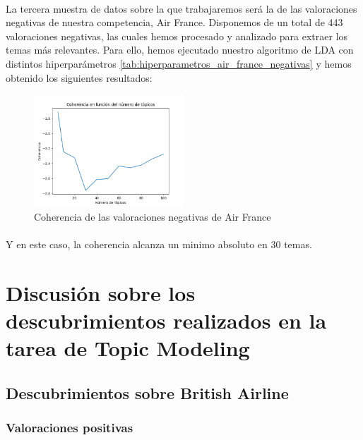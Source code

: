 \documentclass{report}
\begin{document}
                    \paragraph*{}{
                        La tercera muestra de datos sobre la que trabajaremos será la de las valoraciones negativas de nuestra competencia, Air France.
                        Disponemos de un total de 443 valoraciones negativas, las cuales hemos procesado y analizado para extraer los temas más relevantes.
                        Para ello, hemos ejecutado nuestro algoritmo de LDA con distintos hiperparámetros \ref{tab:hiperparametros_air_france_negativas} y hemos obtenido los siguientes resultados:
                    }
                    \begin{figure}[H]
                        \centering
                        \includegraphics[width=0.5\textwidth]{./img/air_france_negativas.png}
                        \caption{Coherencia de las valoraciones negativas de Air France}
                    \end{figure}
                    \paragraph*{}{
                        Y en este caso, la coherencia alcanza un minimo absoluto en 30 temas.
                    }
        \clearpage\section{Discusión sobre los descubrimientos realizados en la tarea de Topic Modeling}
            \subsection{Descubrimientos sobre British Airline}
                \subsubsection*{Valoraciones positivas}
\end{document}
